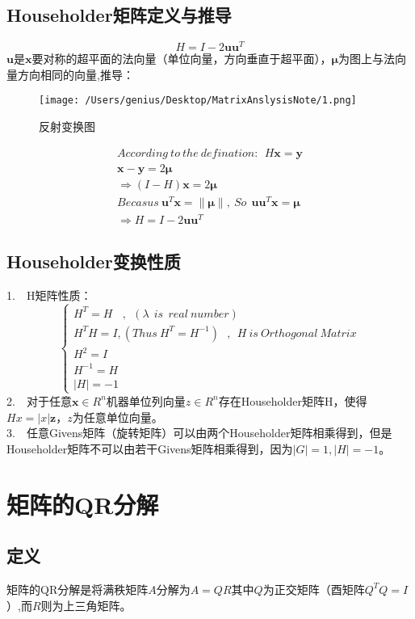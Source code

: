 \documentclass[12pt]{article}
\begin{document}
\begin{CJK*}{UTF8}{gbsn}
\subsection{Householder矩阵定义与推导}
\begin{equation}
	H=I-2\bm u\bm u^T
\end{equation}
$\bm u$是$\bm x$要对称的超平面的法向量（单位向量，方向垂直于超平面），$\bm\mu$为图上与法向量方向相同的向量,推导：
\begin{figure}[h]
	\center
  \texttt{[image: /Users/genius/Desktop/MatrixAnslysisNote/1.png]}
  \caption{反射变换图}
\end{figure}
\begin{align*}
	According~to~the~defination:~~H\bm x=\bm y\\
	\bm x-\bm y =2\bm \mu\\
	\Rightarrow (I-H)\bm x=2\bm \mu\\
	Becasus~  \bm u^T\bm x=\|\bm \mu \|,~So~~\bm u\bm u^T\bm x=\bm \mu\\
	\Rightarrow H=I-2\bm u\bm u^T
\end{align*}
\subsection{Householder变换性质}
1.~~H矩阵性质：
\begin{equation}
	\begin{cases}
		H^T=H~~~~,~~(\lambda~~is~~real~number)\\
		H^TH=I,(Thus~H^T=H^{-1})~~~,~~H~is~Orthogonal~Matrix\\
		H^2=I\\
		H^{-1}=H\\
		|H|=-1
	\end{cases}
\end{equation}
2.~~对于任意$\bm x\in R^{n}$机器单位列向量$z\in R^{n}$存在Householder矩阵H，使得$Hx=|x|\bm z$，$z$为任意单位向量。\\
3.~~任意Givens矩阵（旋转矩阵）可以由两个Householder矩阵相乘得到，但是Householder矩阵不可以由若干Givens矩阵相乘得到，因为$|G|=1,|H|=-1$。

\section{矩阵的QR分解}
\subsection{定义}
矩阵的QR分解是将满秩矩阵$A$分解为$A=QR$其中$Q$为正交矩阵（酉矩阵$Q^TQ=I$）,而$R$则为上三角矩阵。

\end{CJK*}
\end{document}
